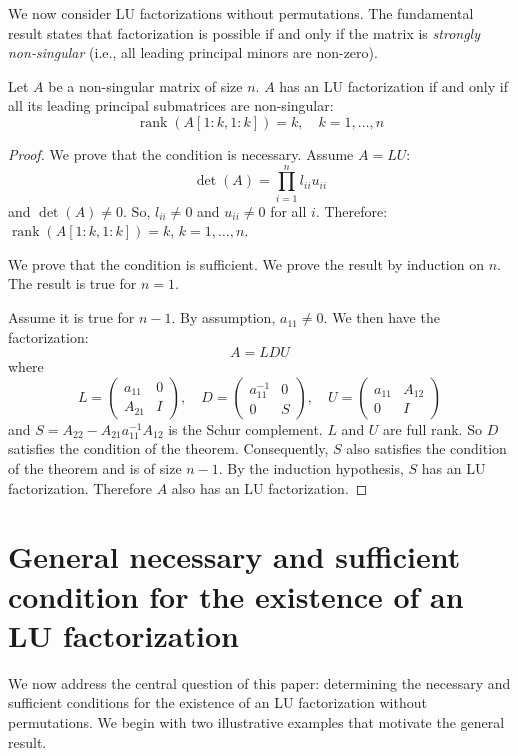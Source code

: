 \documentclass[10pt,twoside]{siamart1116}
\DeclareMathOperator{\rk}{rank}
\numberwithin{theorem}{section}
\begin{document}
We now consider LU factorizations without permutations. The fundamental result states that factorization is possible if and only if the matrix is \emph{strongly non-singular} (i.e., all leading principal minors are non-zero).

\begin{proposition}\label{prop:sufficient}
	Let $A$ be a non-singular matrix of size $n$. $A$ has an LU factorization if and only if all its leading principal submatrices are non-singular:
	\[
		\rk(A[1:k,1:k]) = k, \quad k = 1, \ldots, n
	\]
\end{proposition}

\begin{proof}
	We prove that the condition is necessary. Assume $A = LU$:
	\[ \det(A) = \prod_{i=1}^n l_{ii} u_{ii} \]
	and $\det(A) \neq 0$. So, $l_{ii} \neq 0$ and $u_{ii} \neq 0$ for all $i$. Therefore: $\rk(A[1:k,1:k]) = k$, $k = 1, \ldots, n$.

	We prove that the condition is sufficient. We prove the result by induction on $n$. The result is true for $n=1$.

	Assume it is true for $n-1$. By assumption, $a_{11} \neq 0$. We then have the factorization:
	\[
		A = LDU
	\]
	where
	\[
		L = \begin{pmatrix}
			a_{11} & 0 \\
			A_{21} & I
		\end{pmatrix}, \quad
		D = \begin{pmatrix}
			a_{11}^{-1} & 0 \\
			0           & S
		\end{pmatrix}, \quad
		U = \begin{pmatrix}
			a_{11} & A_{12} \\
			0      & I
		\end{pmatrix}
	\]
	and $S = A_{22} - A_{21} a_{11}^{-1} A_{12}$ is the Schur complement. $L$ and $U$ are full rank. So $D$ satisfies the condition of the theorem. Consequently, $S$ also satisfies the condition of the theorem and is of size $n-1$. By the induction hypothesis, $S$ has an LU factorization. Therefore $A$ also has an LU factorization.
\end{proof}

\section{General necessary and sufficient condition for the existence of an LU factorization}\label{sec:main}

We now address the central question of this paper: determining the necessary and sufficient conditions for the existence of an LU factorization without permutations. We begin with two illustrative examples that motivate the general result.
\end{document}
